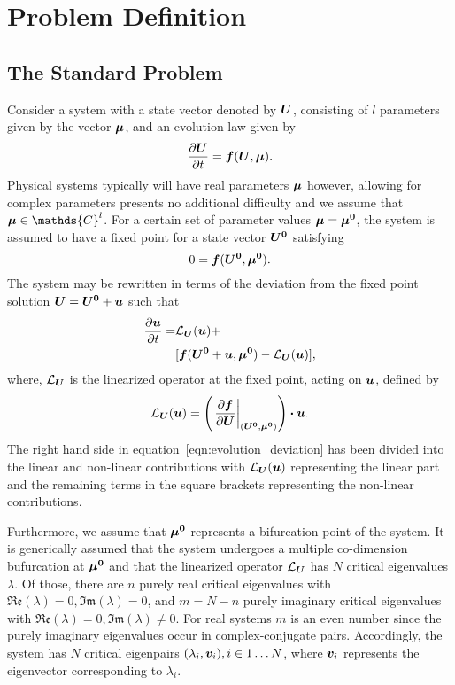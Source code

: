 \section{Problem Definition}
\label{sec:problem_setup}

\subsection{The Standard Problem}
\label{sec:standard}

Consider a system with a state vector denoted by $\boldsymbol{U}$, consisting of $l$ parameters given by the vector $\boldsymbol{\mu}$, and an evolution law given by 
\begin{equation}
	\frac{\partial \boldsymbol{U}}{\partial t} = \boldsymbol{f}(\boldsymbol{U},\boldsymbol{\mu}).
	\label{eqn:evolution0}
\end{equation}
Physical systems typically will have real parameters $\boldsymbol{\mu}$ however, allowing for complex parameters presents no additional difficulty and we assume that $\vecmu \in \mathds{C}^{l}$. 
For a certain set of parameter values $\boldsymbol{\mu} = \boldsymbol{\mu^{0}}$, the system is assumed to have a fixed point for a state vector $\boldsymbol{U^{0}}$ satisfying
\begin{equation}
	0 = \boldsymbol{f}(\boldsymbol{U^{0}},\boldsymbol{\mu^{0}}).
	\label{eqn:fixed_point}
\end{equation}
The system may be rewritten in terms of the deviation from the fixed point solution $\boldsymbol{U} =  \boldsymbol{U^{0}} + \boldsymbol{u}$ such that 
\begin{equation}
	\begin{split}
		\frac{\partial \boldsymbol{u}}{\partial t} =& \mathcal{L}_{\boldsymbol{U}}(\boldsymbol{u}) + \\
		& [\boldsymbol{f}(\boldsymbol{U^{0}} + \boldsymbol{u},\boldsymbol{\mu^{0}}) - \mathcal{L}_{\boldsymbol{U}}(\boldsymbol{u})],
	\end{split}
	\label{eqn:evolution_deviation}
\end{equation}
where, $\mathcal{L}_{\boldsymbol{U}}$ is the linearized operator at the fixed point, acting on $\boldsymbol{u}$, defined by
\begin{equation}
	\mathcal{L}_{\boldsymbol{U}}(\boldsymbol{u}) = \left(\left.\frac{\partial \boldsymbol{f}}{\partial \boldsymbol{U}}\right|_{(\boldsymbol{U^{0}},\boldsymbol{\mu^{0}})} \right)\boldsymbol{\cdot} \boldsymbol{u}.
	\label{eqn:linearized_operator_u}
\end{equation}
The right hand side in equation~\eqref{eqn:evolution_deviation} has been divided into the linear and non-linear contributions with $\mathcal{L}_{\boldsymbol{U}}(\boldsymbol{u})$ representing the linear part and the remaining terms in the square brackets representing the non-linear contributions.

Furthermore, we assume that $\boldsymbol{\mu^{0}}$ represents a bifurcation point of the system. It is generically assumed that the system undergoes a multiple co-dimension bufurcation at $\boldsymbol{\mu^{0}}$ and that the linearized operator $\mathcal{L}_{\boldsymbol{U}}$ has $N$ critical eigenvalues $\lambda$. Of those, there are 
$n$ purely real critical eigenvalues with $\mathfrak{Re}(\lambda) = 0, \mathfrak{Im}(\lambda) = 0$, and $m = N - n$ purely imaginary critical eigenvalues with $\mathfrak{Re}(\lambda) = 0, \mathfrak{Im}(\lambda) \ne 0$. For real systems $m$ is an even number since the purely imaginary eigenvalues occur in complex-conjugate pairs. Accordingly, the system has $N$ critical eigenpairs $(\lambda_{i},\boldsymbol{v}_{i}), i\in 1\ldots N$, where $\boldsymbol{v}_{i}$ represents the eigenvector corresponding to $\lambda_{i}$. 

